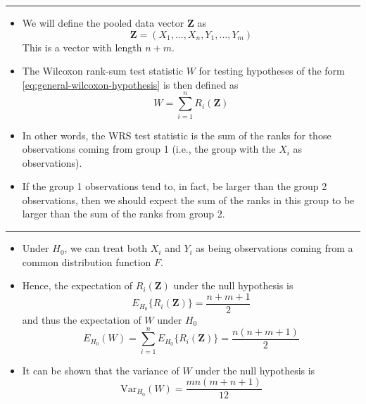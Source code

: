 \documentclass[]{book}
\begin{document}
\begin{center}\rule{0.5\linewidth}{\linethickness}\end{center}

\begin{itemize}
\item
  We will define the pooled data vector \(\mathbf{Z}\) as
  \begin{equation}
  \mathbf{Z} = (X_{1}, \ldots, X_{n}, Y_{1}, \ldots, Y_{m})
  \end{equation}
  This is a vector with length \(n + m\).
\item
  The Wilcoxon rank-sum test statistic \(W\) for testing hypotheses of the form \eqref{eq:general-wilcoxon-hypothesis}
  is then defined as
  \begin{equation}
  W = \sum_{i=1}^{n} R_{i}( \mathbf{Z} )
  \label{eq:wrs-formula}
  \end{equation}
\item
  In other words, the WRS test statistic is the sum of the ranks for those observations coming
  from group 1 (i.e., the group with the \(X_{i}\) as observations).
\item
  If the group 1 observations tend to, in fact, be larger than the group 2 observations,
  then we should expect the sum of the ranks in this group to be larger than the sum of the
  ranks from group 2.
\end{itemize}

\begin{center}\rule{0.5\linewidth}{\linethickness}\end{center}

\begin{itemize}
\item
  Under \(H_{0}\), we can treat both \(X_{i}\) and \(Y_{i}\) as being observations coming from
  a common distribution function \(F\).
\item
  Hence, the expectation of \(R_{i}(\mathbf{Z})\) under the null hypothesis is
  \begin{equation}
  E_{H_{0}}\{ R_{i}(\mathbf{Z}) \} = \frac{n + m + 1}{2}
  \end{equation}
  and thus the expectation of \(W\) under \(H_{0}\)
  \begin{equation}
  E_{H_{0}}( W ) = \sum_{i=1}^{n} E_{H_{0}}\{ R_{i}( \mathbf{Z} ) \}
  = \frac{ n(n + m + 1)  }{ 2 }
  \end{equation}
\item
  It can be shown that the variance of \(W\) under the null hypothesis is
  \begin{equation}
  \textrm{Var}_{H_{0}}( W ) = \frac{mn(m + n + 1)}{12}
  \end{equation}
\end{itemize}
\end{document}
